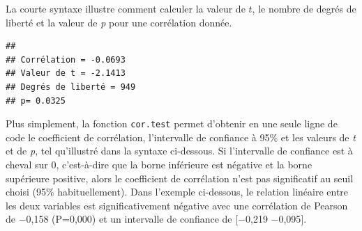 \documentclass[
  11pt,
  french,
]{book}
\makeatletter
\newenvironment{Shaded}{\begin{snugshade}}{\end{snugshade}}
\newcommand{\CharTok}[1]{\textcolor[rgb]{0.31,0.60,0.02}{#1}}
\newcommand{\CommentTok}[1]{\textcolor[rgb]{0.56,0.35,0.01}{\textit{#1}}}
\newcommand{\DecValTok}[1]{\textcolor[rgb]{0.00,0.00,0.81}{#1}}
\newcommand{\KeywordTok}[1]{\textcolor[rgb]{0.13,0.29,0.53}{\textbf{#1}}}
\newcommand{\NormalTok}[1]{#1}
\newcommand{\OperatorTok}[1]{\textcolor[rgb]{0.81,0.36,0.00}{\textbf{#1}}}
\newcommand{\StringTok}[1]{\textcolor[rgb]{0.31,0.60,0.02}{#1}}
\newenvironment{kframe}{%
\medskip{}
\setlength{\fboxsep}{.8em}
 \def\at@end@of@kframe{}%
 \ifinner\ifhmode%
  \def\at@end@of@kframe{\end{minipage}}%
  \begin{minipage}{\columnwidth}%
 \fi\fi%
 \def\FrameCommand##1{\hskip\@totalleftmargin \hskip-\fboxsep
 \colorbox{shadecolor}{##1}\hskip-\fboxsep
     \hskip-\linewidth \hskip-\@totalleftmargin \hskip\columnwidth}%
 \MakeFramed {\advance\hsize-\width
   \@totalleftmargin\z@ \linewidth\hsize
   \@setminipage}}%
 {\par\unskip\endMakeFramed%
 \at@end@of@kframe}
\renewenvironment{Shaded}{\begin{kframe}}{\end{kframe}}
\makeatother
\begin{document}
La courte syntaxe illustre comment calculer la valeur de \(t\), le nombre de degrés de liberté et la valeur de \emph{p} pour une corrélation donnée.

\begin{Shaded}
\end{Shaded}

\begin{verbatim}
## 
## Corrélation = -0.0693 
## Valeur de t = -2.1413 
## Degrés de liberté = 949 
## p= 0.0325
\end{verbatim}

Plus simplement, la fonction \texttt{cor.test} permet d'obtenir en une seule ligne de code le coefficient de corrélation, l'intervalle de confiance à 95\% et les valeurs de \emph{t} et de \emph{p}, tel qu'illustré dans la syntaxe ci-dessous. Si l'intervalle de confiance est à cheval sur 0, c'est-à-dire que la borne inférieure est négative et la borne supérieure positive, alors le coefficient de corrélation n'est pas significatif au seuil choisi (95\% habituellement). Dans l'exemple ci-dessous, le relation linéaire entre les deux variables est significativement négative avec une corrélation de Pearson de −0,158 (P=0,000) et un intervalle de confiance de {[}−0,219 −0,095{]}.
\end{document}
